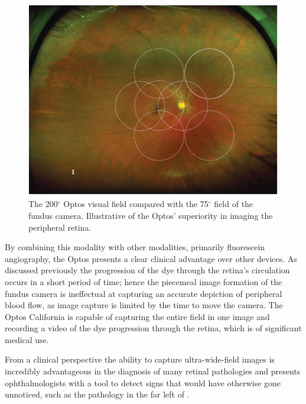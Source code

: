 \begin{figure}[H]
\centering
\includegraphics{figures/uwfvs}
\caption{The 200$^\circ$ Optos visual field compared with the 75$^\circ$ field of the fundus camera. Illustrative of the Optos' superiority in imaging the peripheral retina.\cite{1_optos.com_2015}}
\label{fig:uwfvs}
   \end{figure}

By combining this modality with other modalities, primarily fluorescein
angiography, the Optos presents a clear clinical advantage over other
devices. As discussed previously the progression of the dye through the
retina's circulation occurs in a short period of time; hence the piecemeal
image formation of the fundus camera is ineffectual at capturing an
accurate depiction of peripheral blood flow, as image capture is limited
by the time to move the camera. The Optos California is capable of
capturing the entire field in one image and recording a video of the dye
progression through the retina, which is of significant medical use.

From a clinical perspective the ability to capture ultra-wide-field images
is incredibly advantageous in the diagnosis of many retinal pathologies
\cite{6_witmer_kozbial_daniel_kiss_2012} and presents ophthalmologists
with a tool to detect signs that would have otherwise gone unnoticed, such
as the pathology in the far left of .


